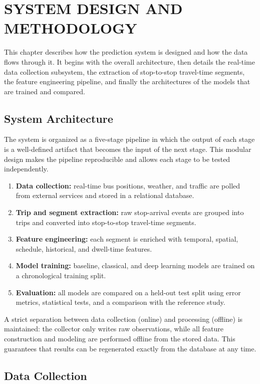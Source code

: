 \chapter{SYSTEM DESIGN AND METHODOLOGY}

This chapter describes how the prediction system is designed and how the data flows through it. It begins with the overall architecture, then details the real-time data collection subsystem, the extraction of stop-to-stop travel-time segments, the feature engineering pipeline, and finally the architectures of the models that are trained and compared.

\section{System Architecture}

The system is organized as a five-stage pipeline in which the output of each stage is a well-defined artifact that becomes the input of the next stage. This modular design makes the pipeline reproducible and allows each stage to be tested independently.

\begin{enumerate}
    \item \textbf{Data collection:} real-time bus positions, weather, and traffic are polled from external services and stored in a relational database.
    \item \textbf{Trip and segment extraction:} raw stop-arrival events are grouped into trips and converted into stop-to-stop travel-time segments.
    \item \textbf{Feature engineering:} each segment is enriched with temporal, spatial, schedule, historical, and dwell-time features.
    \item \textbf{Model training:} baseline, classical, and deep learning models are trained on a chronological training split.
    \item \textbf{Evaluation:} all models are compared on a held-out test split using error metrics, statistical tests, and a comparison with the reference study.
\end{enumerate}

A strict separation between data collection (online) and processing (offline) is maintained: the collector only writes raw observations, while all feature construction and modeling are performed offline from the stored data. This guarantees that results can be regenerated exactly from the database at any time.

\section{Data Collection}

